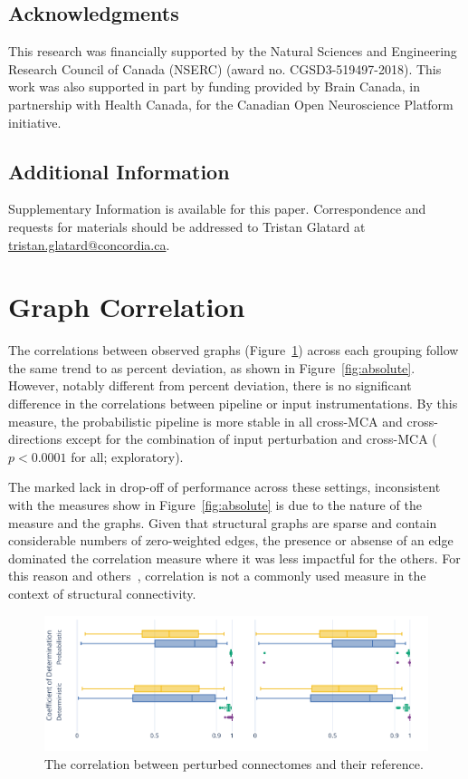 \documentclass[fleqn,10pt]{SelfArx} %
\begin{document}
\subsection*{Acknowledgments} 
This research was financially supported by the Natural Sciences and Engineering Research Council of Canada (NSERC)
(award no. CGSD3-519497-2018). This work was also supported in part by funding provided by Brain Canada, in partnership
with Health Canada, for the Canadian Open Neuroscience Platform initiative.

\subsection*{Additional Information}
Supplementary Information is available for this paper. Correspondence and requests for materials should be addressed to
Tristan Glatard at \url{tristan.glatard@concordia.ca}.

\beginsupplement

\clearpage
\section{Graph Correlation}
\label{supsec:correlation}
The correlations between observed graphs (Figure~\ref{fig:correlation}) across each grouping follow the same trend to
as percent deviation, as shown in Figure~\ref{fig:absolute}. However, notably different from percent deviation, there
is no significant difference in the correlations between pipeline or input instrumentations. By this measure, the
probabilistic pipeline is more stable in all cross-MCA and cross-directions except for the combination of input
perturbation and cross-MCA ($p < 0.0001$ for all; exploratory).

The marked lack in drop-off of performance across these settings, inconsistent with the measures show in
Figure~\ref{fig:absolute} is due to the nature of the measure and the graphs. Given that structural graphs are sparse
and contain considerable numbers of zero-weighted edges, the presence or absense of an edge dominated the correlation
measure where it was less impactful for the others. For this reason and others~\cite{huang2016linking}, correlation is
not a commonly used measure in the context of structural connectivity.

\begin{figure}[ht]\centering
\includegraphics[width=\linewidth]{figures/figS1_correlation_differences.pdf}
\caption{The correlation between perturbed connectomes and their reference.}
\label{fig:correlation}
\end{figure}
\end{document}
